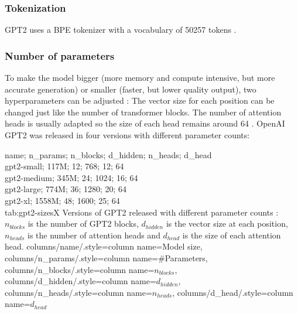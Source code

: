\subsubsection{Tokenization}


\label{gpt2:tokenizer}

GPT2 uses a BPE tokenizer with a vocabulary of 50257 tokens  \cite{HuggingFaceGPT2}.

\subsubsection{Number of parameters}

\label{gpt2:parameters}

To make the model bigger (more memory and compute intensive, but more accurate generation) or smaller (faster, but lower quality output), two hyperparameters can be adjusted  : The vector size for each position can be changed just like the number of transformer blocks. The number of attention heads is usually adapted so the size of each head remains around 64  \cite{hfpretrained}.
OpenAI GPT2 was released in four versions with different parameter counts:

{
    name; n_params; n_blocks; d_hidden; n_heads; d_head\\
    gpt2-small; 117M; 12; 768; 12; 64 \\
    gpt2-medium; 345M; 24; 1024; 16; 64 \\
    gpt2-large; 774M; 36; 1280; 20; 64 \\
    gpt2-xl; 1558M; 48; 1600; 25; 64 \\
}
{tab:gpt2-sizesX}
{
    Versions of GPT2 released with different parameter counts \cite{hfpretrained}: $n_{blocks}$ is the number of GPT2 blocks, $d_{hidden}$ is the vector size at each position, $n_{heads}$ is the number of attention heads and $d_{head}$ is the size of each attention head.
}
{%
    columns/name/.style={column name={Model size}},
    columns/n_params/.style={column name={\#Parameters}},
    columns/n_blocks/.style={column name={$n_{blocks}$}},
    columns/d_hidden/.style={column name={$d_{hidden}$}},
    columns/n_heads/.style={column name={$n_{heads}$}},
    columns/d_head/.style={column name={$d_{head}$}}
}

